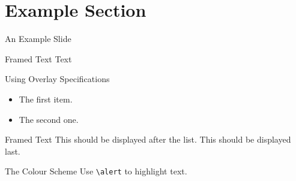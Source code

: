 \section{Example Section}
\begin{frame}{An Example Slide}
\begin{block}{Framed Text}
Text \insertsectionhead
\end{block}
\end{frame}
\begin{frame}{Using Overlay Specifications}
\begin{itemize}[<+(1)->]
\item The first item.
\item The second one.
\end{itemize}
\pause
\begin{block}{Framed Text}
This should be displayed after the list.
\pause
This should be displayed last.
\end{block}
\end{frame}
\begin{frame}{The Colour Scheme}
Use \texttt{\textbackslash alert} to highlight \alert{text}.
\end{frame}